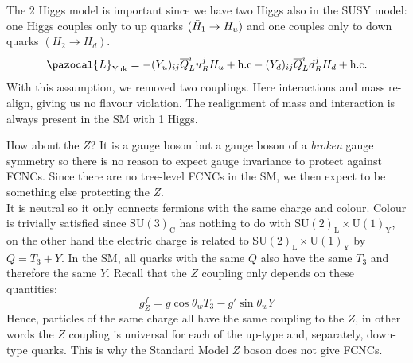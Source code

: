 \documentclass[../main.tex]{subfiles}
\begin{document}
\begin{kaobox}[frametitle=Two Higgs doublet model]
{}
The 2 Higgs model is important since we have two Higgs also in the SUSY model: one Higgs couples only to up quarks $(\Tilde{H}_1\to H_u)$ and one couples only to down quarks $(H_2\to H_d)$.
\[
\pazocal{L}_{\text{Yuk}}=-(Y_u)_{ij}\overline{Q}_L^iu_R^jH_u+\text{h.c}-(Y_d)_{ij}\overline{Q}_L^id_R^jH_d+\text{h.c.}
\]
With this assumption, we removed two couplings. Here interactions and mass re-align, giving us no flavour violation. The realignment of mass and interaction is always present in the SM with 1 Higgs.
\end{kaobox}
How about the $Z$? It is a gauge boson but a gauge boson of a \textit{broken} gauge symmetry so there is no reason to expect gauge invariance to protect against FCNCs. Since there are no tree-level FCNCs in the SM, we then expect to be something else protecting the $Z$.\\
It is neutral so it only connects fermions with the same charge and colour. Colour is trivially satisfied since SU$(3)_{\text{C}}$ has nothing to do with SU$(2)_{\text{L}}\times$U$(1)_{\text{Y}}$, on the other hand the electric charge is related to SU$(2)_{\text{L}}\times$U$(1)_{\text{Y}}$ by $Q=T_3+Y$. In the SM, all quarks with the same $Q$ also have the same $T_3$ and therefore the same $Y$. Recall that the $Z$ coupling only depends on these quantities:
\[
g_Z^f=g\cos\theta_wT_3-g'\sin\theta_wY
\]
Hence, particles of the same charge all have the same coupling to the $Z$, in other words the $Z$ coupling is universal for each of the up-type and, separately, down-type quarks. This is why the Standard Model $Z$ boson does not give FCNCs.
\end{document}
